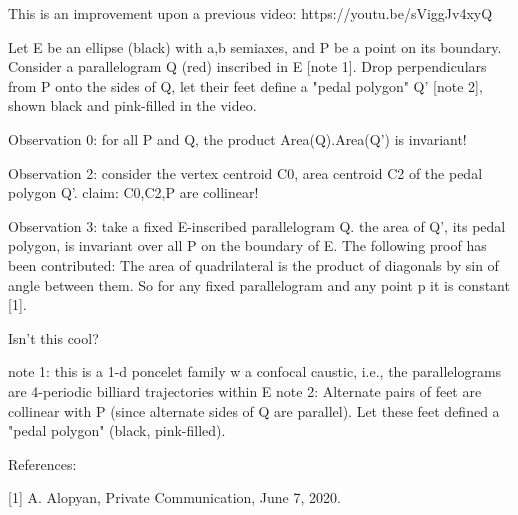 This is an improvement upon a previous video: https://youtu.be/sViggJv4xyQ

Let E be an ellipse (black) with a,b semiaxes, and P be a point on its boundary. Consider a parallelogram Q (red) inscribed in E [note 1]. Drop perpendiculars from P onto the sides of Q, let their feet define a "pedal polygon"  Q' [note 2], shown black and pink-filled in the video.

Observation 0: for all P and Q, the product Area(Q).Area(Q') is invariant!

Observation 2: consider the vertex centroid C0, area centroid C2 of the pedal polygon Q'. claim: C0,C2,P are collinear!

Observation 3: take a fixed E-inscribed parallelogram Q. the area of Q', its pedal polygon, is invariant over all P on the boundary of E. The following proof has been contributed: The area of quadrilateral is the product of diagonals by sin of angle between them. So for any fixed parallelogram and any point p it is constant [1].

Isn't this cool?

note 1: this is a 1-d poncelet family w a confocal caustic, i.e., the parallelograms are 4-periodic billiard trajectories within E
note 2: Alternate pairs of feet are collinear with P (since alternate sides of Q are parallel). Let these feet defined a "pedal polygon"  (black, pink-filled).

References:

[1] A. Alopyan, Private Communication, June 7, 2020.